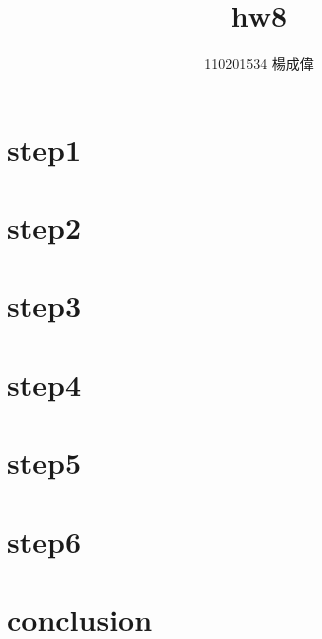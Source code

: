 \documentclass{article}
\title{hw8}
\author{110201534 楊成偉}
\date{}
\begin{document}
\begin{CJK*}{UTF8}{bkai}
\maketitle

\section*{step1}
\section*{step2}
\section*{step3}
\section*{step4}
\section*{step5}
\section*{step6}

\section*{conclusion}

\end{CJK*}
\end{document}
